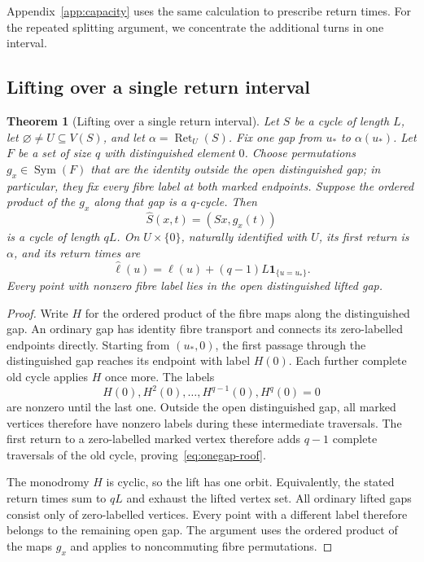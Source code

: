 \documentclass[11pt,reqno]{amsart}
\numberwithin{equation}{section}
\newtheorem{theorem}{Theorem}[section]
\theoremstyle{definition}
\theoremstyle{remark}
\newcommand{\one}{\mathbf 1}
\newcommand{\Ret}{\operatorname{Ret}}
\newcommand{\Sym}{\operatorname{Sym}}
\begin{document}
Appendix~\ref{app:capacity} uses the same calculation to prescribe
return times. For the repeated splitting argument, we concentrate the
additional turns in one interval.

\subsection{Lifting over a single return interval}

\begin{theorem}[Lifting over a single return interval]\label{thm:onegap}
Let $S$ be a cycle of length $L$, let $\varnothing\ne U\subseteq V(S)$, and let
$\alpha=\Ret_U(S)$. Fix one gap from $u_*$ to $\alpha(u_*)$. Let $F$ be a set of
size $q$ with distinguished element $0$. Choose permutations $g_x\in\Sym(F)$
that are the identity outside the open distinguished gap; in particular,
they fix every fibre label at both marked endpoints. Suppose the ordered product of the $g_x$ along that gap is a $q$-cycle.
Then
\[
 \widehat S(x,t)=(Sx,g_x(t))
\]
is a cycle of length $qL$. On $U\times\{0\}$, naturally identified with $U$,
its first return is $\alpha$, and its return times are
\begin{equation}\label{eq:onegap-roof}
 \widehat\ell(u)=\ell(u)+(q-1)L\one_{\{u=u_*\}}.
\end{equation}
Every point with nonzero fibre label lies in the open distinguished lifted gap.
\end{theorem}
\begin{proof}
Write $H$ for the ordered product of the fibre maps along the distinguished gap.
An ordinary gap has identity fibre transport and connects its zero-labelled
endpoints directly. Starting from $(u_*,0)$, the first passage through the
distinguished gap reaches its endpoint with label $H(0)$. Each further complete
old cycle applies $H$ once more. The labels
\[
 H(0),H^2(0),\ldots,H^{q-1}(0),H^q(0)=0
\]
are nonzero until the last one. Outside the open distinguished gap, all marked
vertices therefore have nonzero labels during these intermediate traversals.
The first return to a zero-labelled marked vertex therefore adds
$q-1$ complete traversals of the old cycle, proving~\eqref{eq:onegap-roof}.

The monodromy $H$ is cyclic, so the lift has one orbit. Equivalently, the stated
return times sum to $qL$ and exhaust the lifted vertex set. All ordinary lifted
gaps consist only of zero-labelled vertices. Every point with a different label
therefore belongs to the remaining open gap. The argument uses the ordered
product of the maps $g_x$ and applies to noncommuting fibre permutations.
\end{proof}
\end{document}
